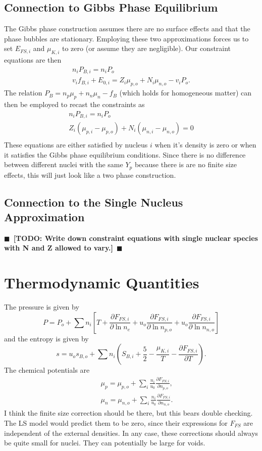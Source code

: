 \documentclass[11pt,letter]{article}
\newcommand{\todo}[1]{{$\blacksquare$~\textbf{\color{blue}[TODO: #1]}}~$\blacksquare$}
\begin{document}
\subsection{Connection to Gibbs Phase Equilibrium}
The Gibbs phase construction assumes there are no surface effects and that the
phase bubbles are stationary.  Employing these two approximations forces us to
set $E_{FS,i}$ and $\mu_{K,i}$ to zero (or assume they are negligible).  Our
constraint equations are then \begin{eqnarray}
n_i P_{B,i} = n_i P_o \\ 
v_i f_{B,i} + E_{0,i} =  Z_i \mu_{p,o} + N_i \mu_{n,o} - v_i P_o.
\end{eqnarray}
The relation $P_B = n_p \mu_p + n_n \mu_n - f_B$ (which holds for 
homogeneous matter) can then be employed to recast
the constraints as \begin{eqnarray}
n_i P_{B,i} = n_i P_o \\ 
Z_i \left(\mu_{p,i} - \mu_{p,o}\right) + N_i \left(\mu_{n,i} - \mu_{n,o}\right) = 0\\
\end{eqnarray}
These equations are either satisfied by nucleus $i$ when it's density is zero or
when it satisfies the Gibbs phase equilibrium conditions.  Since there is no
difference between different nuclei with the same $Y_p$ because there is are no
finite size effects, this will just look like a two phase construction.    

\subsection{Connection to the Single Nucleus Approximation} 
\todo{Write down constraint equations with single nuclear species with N and Z 
allowed to vary.}

\section{Thermodynamic Quantities} 
The pressure is given by 
\begin{equation}
P = P_o + \sum n_i \left[ T + \frac{\partial F_{FS,i}}{\partial \ln n_e} 
+ u_o \frac{\partial F_{FS,i}}{\partial \ln n_{p,o}} 
+ u_o \frac{\partial F_{FS,i}}{\partial \ln n_{n,o}} \right]  
\end{equation}
and the entropy is given by 
\begin{equation}
s = u_o s_{B,o} + \sum n_i \left(S_{B,i} + \frac{5}{2} - \frac{\mu_{K,i}}{T} 
- \frac{\partial F_{FS,i}}{\partial T}\right).
\end{equation}
The chemical potentials are 
\begin{eqnarray}
&& \mu_p = \mu_{p,o} + \sum_i \frac{n_i}{u_0} \frac{\partial F_{FS,i}}{\partial n_{p,o}}, \\
&& \mu_n = \mu_{n,o} + \sum_i \frac{n_i}{u_0} \frac{\partial F_{FS,i}}{\partial n_{n,o}}.
\end{eqnarray}
I think the finite size correction should be there, but this bears double
checking.  The LS model would predict them to be zero, since their expressions for
$F_{FS}$ are independent of the external densities.  In any case, these 
corrections should always be quite small for nuclei.  They can potentially be 
large for voids.
\end{document}
